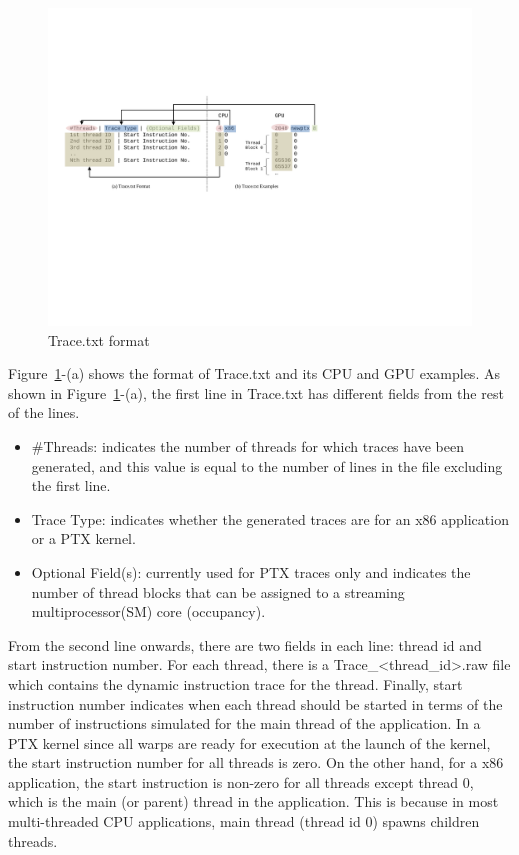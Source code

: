 \begin{figure}[htb]
\centering
\includegraphics{figs/trace_format}
\caption{Trace.txt format}
\label{fig:trace_format}
\end{figure}


Figure~\ref{fig:trace_format}-(a) shows the format of Trace.txt and its CPU and GPU
examples.  As shown in Figure~\ref{fig:trace_format}-(a), the first line in
Trace.txt has different fields from the rest of the lines.

\begin{itemize}\itemsep2pt
\item \#Threads: indicates the number of threads for which traces have
  been generated, and this value is equal to the number of lines in
  the file excluding the first line.
\item Trace Type: indicates whether the generated traces are for an
  x86 application or a PTX kernel.
\item Optional Field(s): currently used for PTX traces only and
  indicates the number of thread blocks that can be assigned to a
  streaming multiprocessor(SM) core (occupancy).
\end{itemize}

From the second line onwards, there are two fields in each line:
thread id and start instruction number. For each thread, there is a
Trace\_<thread\_id>.raw file which contains the dynamic instruction
trace for the thread. Finally, start instruction number indicates when
each thread should be started in terms of the number of instructions
simulated for the main thread of the application. In a PTX kernel
since all warps are ready for execution at the launch of the kernel,
the start instruction number for all threads is zero. On the other
hand, for a x86 application, the start instruction is non-zero for all
threads except thread 0, which is the main (or parent) thread in the
application. This is because in most multi-threaded CPU applications,
main thread (thread id 0) spawns children threads.


